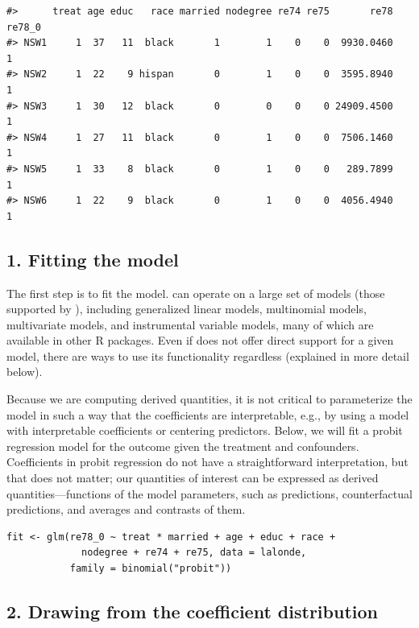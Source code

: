 \begin{verbatim}
#>      treat age educ   race married nodegree re74 re75       re78 re78_0
#> NSW1     1  37   11  black       1        1    0    0  9930.0460      1
#> NSW2     1  22    9 hispan       0        1    0    0  3595.8940      1
#> NSW3     1  30   12  black       0        0    0    0 24909.4500      1
#> NSW4     1  27   11  black       0        1    0    0  7506.1460      1
#> NSW5     1  33    8  black       0        1    0    0   289.7899      1
#> NSW6     1  22    9  black       0        1    0    0  4056.4940      1
\end{verbatim}

\subsection{1. Fitting the model}\label{fitting-the-model}

The first step is to fit the model.  can operate on a large set of models (those supported by ), including generalized linear models, multinomial models, multivariate models, and instrumental variable models, many of which are available in other R packages. Even if  does not offer direct support for a given model, there are ways to use its functionality regardless (explained in more detail below).

Because we are computing derived quantities, it is not critical to parameterize the model in such a way that the coefficients are interpretable, e.g., by using a model with interpretable coefficients or centering predictors. Below, we will fit a probit regression model for the outcome given the treatment and confounders. Coefficients in probit regression do not have a straightforward interpretation, but that does not matter; our quantities of interest can be expressed as derived quantities---functions of the model parameters, such as predictions, counterfactual predictions, and averages and contrasts of them.

\begin{verbatim}
fit <- glm(re78_0 ~ treat * married + age + educ + race +
             nodegree + re74 + re75, data = lalonde,
           family = binomial("probit"))
\end{verbatim}

\subsection{2. Drawing from the coefficient distribution}\label{drawing-from-the-coefficient-distribution}

